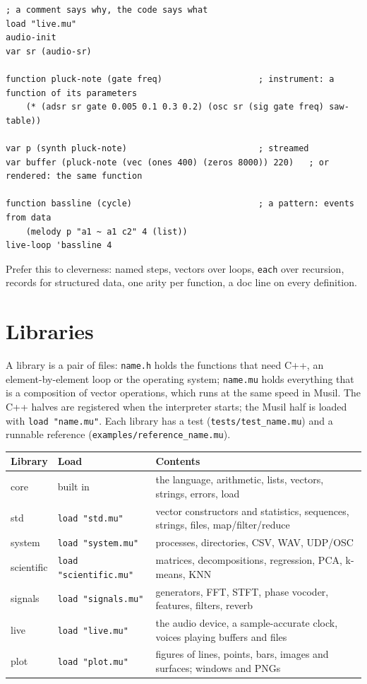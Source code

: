 \documentclass[11pt,a4paper]{article}
\newcommand{\musil}[1]{\lstinline[style=musilinline]{#1}}
\begin{document}
\begin{lstlisting}
; a comment says why, the code says what
load "live.mu"
audio-init
var sr (audio-sr)

function pluck-note (gate freq)                   ; instrument: a function of its parameters
    (* (adsr sr gate 0.005 0.1 0.3 0.2) (osc sr (sig gate freq) saw-table))

var p (synth pluck-note)                          ; streamed
var buffer (pluck-note (vec (ones 400) (zeros 8000)) 220)   ; or rendered: the same function

function bassline (cycle)                         ; a pattern: events from data
    (melody p "a1 ~ a1 c2" 4 (list))
live-loop 'bassline 4
\end{lstlisting}

Prefer this to cleverness: named steps, vectors over loops, \musil{each} over recursion,
records for structured data, one arity per function, a doc line on every definition.

\section{Libraries}
\label{sec:libraries}

A library is a pair of files: \texttt{name.h} holds the functions that need C++, an
element-by-element loop or the operating system; \texttt{name.mu} holds everything
that is a composition of vector operations, which runs at the same speed in Musil.
The C++ halves are registered when the interpreter starts; the Musil half is loaded
with \musil{load "name.mu"}. Each library has a test (\texttt{tests/test\_name.mu})
and a runnable reference (\texttt{examples/reference\_name.mu}).

\begin{center}
\begin{tabular}{@{}lll@{}}
\toprule
\textbf{Library} & \textbf{Load} & \textbf{Contents} \\
\midrule
core & built in & the language, arithmetic, lists, vectors, strings, errors, load \\
std & \musil{load "std.mu"} & vector constructors and statistics, sequences, strings, files, map/filter/reduce \\
system & \musil{load "system.mu"} & processes, directories, CSV, WAV, UDP/OSC \\
scientific & \musil{load "scientific.mu"} & matrices, decompositions, regression, PCA, k-means, KNN \\
signals & \musil{load "signals.mu"} & generators, FFT, STFT, phase vocoder, features, filters, reverb \\
live & \musil{load "live.mu"} & the audio device, a sample-accurate clock, voices playing buffers and files \\
plot & \musil{load "plot.mu"} & figures of lines, points, bars, images and surfaces; windows and PNGs \\
\bottomrule
\end{tabular}
\end{center}
\end{document}
